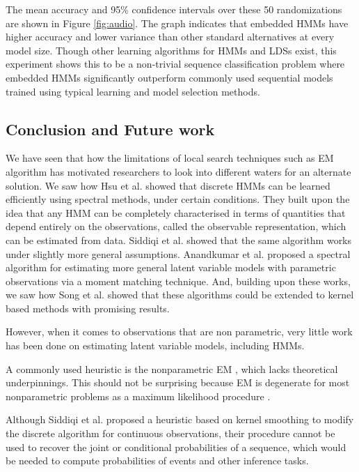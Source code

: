 The mean accuracy and 95\% confidence intervals over
these 50 randomizations are shown in Figure \ref{fig:audio}. The
graph indicates that embedded HMMs have higher accuracy
and lower variance than other standard alternatives
at every model size. Though other learning
algorithms for HMMs and LDSs exist, this experiment
shows this to be a non-trivial sequence classification
problem where embedded HMMs significantly outperform
commonly used sequential models trained using
typical learning and model selection methods.

\subsection{Conclusion and Future work}

We have seen that how the limitations of local search techniques such as EM algorithm has motivated researchers to look into different waters for an alternate  solution. We saw how Hsu et al. \cite{ref2} showed that discrete HMMs can be learned
efficiently using spectral methods, under certain conditions. They built upon the idea that any HMM can be completely characterised
in terms of quantities that depend entirely on the observations, called the observable representation,
which can be estimated from data. Siddiqi et al. \cite{ref7} showed that the same algorithm works under slightly more general assumptions. Anandkumar et al. \cite{ref6} proposed a spectral algorithm for estimating more general latent variable models with parametric observations via a moment matching technique. And, building upon these works, we saw how Song et al.\cite{ref20} showed that these algorithms could be extended to kernel based methods with promising results.


However, when it comes to observations that are non parametric, very little work has been done on estimating latent variable models, including HMMs.

A commonly used heuristic is the nonparametric EM \cite{ref28}, which lacks theoretical underpinnings. This should not be surprising because EM is degenerate for most
nonparametric problems as a maximum likelihood procedure \cite{ref29}.

Although Siddiqi et al.\cite{ref7} proposed a heuristic based on kernel smoothing to modify the discrete algorithm for continuous observations, their procedure cannot be used to recover the joint or conditional probabilities
of a sequence, which would be needed to compute probabilities of events and other inference tasks.


